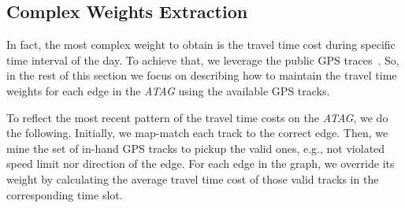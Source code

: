 \subsection{Complex Weights Extraction}
In fact, the most complex weight to obtain is the travel time cost during specific time interval of the day.
To achieve that, we leverage the public GPS traces~\cite{JOS13}. So, in the rest of this section we focus on describing how to maintain the travel time weights for each edge in the {\em ATAG} using the available GPS tracks.

To reflect the most recent pattern of the travel time costs on the {\em ATAG}, we do the following.
Initially, we map-match each track to the correct edge. Then, we mine the set of in-hand GPS tracks to pickup the valid ones, e.g., not violated speed limit nor direction of the edge. For each edge in the graph, we override its weight by calculating the average travel time cost of those valid tracks in the corresponding time slot.



